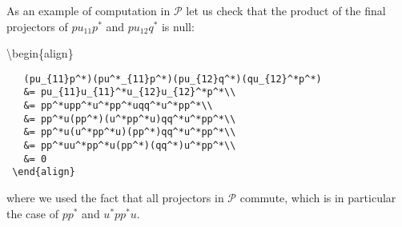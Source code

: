 As an example of computation in \(\mathcal{P}\) let us check that the
product of the final projectors of \(pu_{11}p^*\) and \(pu_{12}q^*\) is
null:

\begin{description}
\tightlist
\item[]
\textbackslash{}begin\{align\}
\end{description}

\texttt{~~~(pu\_\{11\}p\^{}*)(pu\^{}*\_\{11\}p\^{}*)(pu\_\{12\}q\^{}*)(qu\_\{12\}\^{}*p\^{}*)}\\
\texttt{~~~\&=~pu\_\{11\}u\_\{11\}\^{}*u\_\{12\}u\_\{12\}\^{}*p\^{}*\textbackslash{}\textbackslash{}}\\
\texttt{~~~\&=~pp\^{}*upp\^{}*u\^{}*pp\^{}*uqq\^{}*u\^{}*pp\^{}*\textbackslash{}\textbackslash{}}\\
\texttt{~~~\&=~pp\^{}*u(pp\^{}*)(u\^{}*pp\^{}*u)qq\^{}*u\^{}*pp\^{}*\textbackslash{}\textbackslash{}}\\
\texttt{~~~\&=~pp\^{}*u(u\^{}*pp\^{}*u)(pp\^{}*)qq\^{}*u\^{}*pp\^{}*\textbackslash{}\textbackslash{}}\\
\texttt{~~~\&=~pp\^{}*uu\^{}*pp\^{}*u(pp\^{}*)(qq\^{}*)u\^{}*pp\^{}*\textbackslash{}\textbackslash{}}\\
\texttt{~~~\&=~0}\\
\texttt{~\textbackslash{}end\{align\}}

where we used the fact that all projectors in \(\mathcal{P}\) commute,
which is in particular the case of \(pp^*\) and \(u^*pp^*u\).

